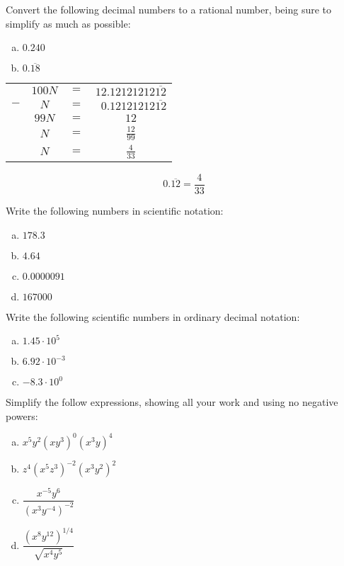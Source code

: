 \documentclass[12pt,letterpaper]{exam}
\begin{document}
\begin{questions}
\newpage
\question[10] Convert the following decimal numbers to a rational number, being sure to simplify as much as possible:
	\begin{enumerate}[(a)]
	\item $0.240$
	\item $0.\overline{18}$
	\end{enumerate}
	\begin{table}[!ht]
	\centering\small
	\begin{tabular}{rccc}
	& $100N$ & $=$ & $12.12121212\overline{12}$ \\ 
	$-$ & $N$ & $=$ & $\phantom{2}0.12121212\overline{12}$ \\ \hline
	& $99N$ & $=$ & $12$ \\[0.1cm]
	& $N$ & $=$ & $\frac{12}{99}$ \\[0.1cm]
	& $N$ & $=$ & $\frac{4}{33}$
	\end{tabular}
	\end{table} \par

	\[
	0.\overline{12}= \dfrac{4}{33}
	\] 


\newpage
\question[10] Write the following numbers in scientific notation:
	\begin{enumerate}[(a)]
	\item $178.3$
	\item $4.64$
	\item $0.0000091$
	\item $167000$
	\end{enumerate}



\newpage
\question[10] Write the following scientific numbers in ordinary decimal notation:
	\begin{enumerate}[(a)]
	\item $1.45 \cdot 10^5$ 
	\item $6.92 \cdot 10^{-3}$
	\item $-8.3 \cdot 10^0$
	\end{enumerate}



\newpage
\question[10] Simplify the follow expressions, showing all your work and using no negative powers:
	\begin{enumerate}[(a)] \itemsep=0.3cm
	\item $x^5 y^2 (xy^3)^0 (x^3y)^4$
	\item $z^4(x^5 z^3)^{-2} (x^3 y^2)^2$
	\item $\dfrac{x^{-5} y^6}{(x^3 y^{-4})^{-2}}$
	\item $\dfrac{(x^8 y^{12})^{1/4}}{\sqrt{x^4 y^5}}$
	\end{enumerate}




\end{questions}
\end{document}
